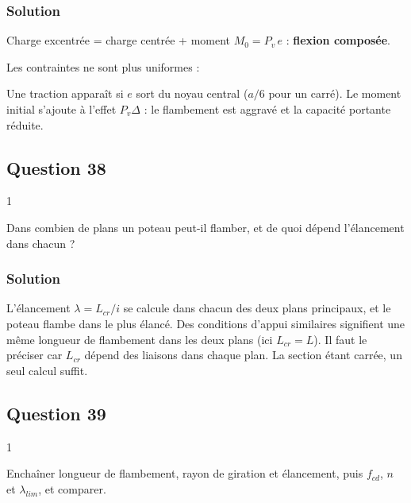 \documentclass[11pt,a4paper]{article}
\newcommand{\equationajustee}[1]{%
  \sbox{\boiteequation}{$\displaystyle #1$}%
  \ifdim\wd\boiteequation>\linewidth
    \[\resizebox{\linewidth}{!}{\usebox{\boiteequation}}\]%
  \else
    \[#1\]%
  \fi}
\begin{document}
\hypertarget{solution-36}{%
\subsubsection{Solution}\label{solution-36}}

Charge excentrée = charge centrée + moment \(M_0=P_v\,e\) : \textbf{flexion composée}.

Les contraintes ne sont plus uniformes :

\equationajustee{\sigma=\frac{P_v}S\pm\frac{M_0v}{I}}

Une traction apparaît si \(e\) sort du noyau central (\(a/6\) pour un carré). Le moment initial s'ajoute à l'effet \(P_v\Delta\) : le flambement est aggravé et la capacité portante réduite.

\hypertarget{question-38}{%
\subsection{Question 38}\label{question-38}}

\begin{indication}{1}

Dans combien de plans un poteau peut-il flamber, et de quoi dépend l'élancement dans chacun ?

\end{indication}

\hypertarget{solution-37}{%
\subsubsection{Solution}\label{solution-37}}

L'élancement \(\lambda=L_{cr}/i\) se calcule dans chacun des deux plans principaux, et le poteau flambe dans le plus élancé. Des conditions d'appui similaires signifient une même longueur de flambement dans les deux plans (ici \(L_{cr}=L\)). Il faut le préciser car \(L_{cr}\) dépend des liaisons dans chaque plan. La section étant carrée, un seul calcul suffit.

\hypertarget{question-39}{%
\subsection{Question 39}\label{question-39}}

\begin{indication}{1}

Enchaîner longueur de flambement, rayon de giration et élancement, puis \(f_{cd}\), \(n\) et \(\lambda_{lim}\), et comparer.

\end{indication}
\end{document}
